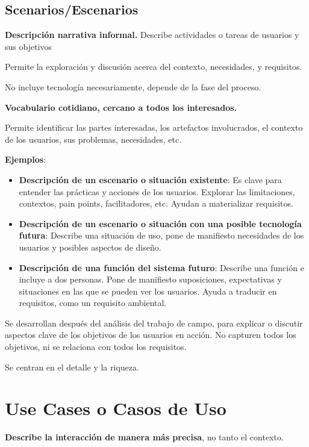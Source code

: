 \documentclass[12pt]{report} %
\begin{document}
\subsection{Scenarios/Escenarios}

\textbf{Descripción narrativa informal.} Describe actividades o tareas
de usuarios y sus objetivos

Permite la exploración y discusión acerca del contexto, necesidades, y
requisitos.

No incluye tecnología necesariamente, depende de la fase del proceso.

\textbf{Vocabulario cotidiano, cercano a todos los interesados.}

Permite identificar las partes interesadas, los artefactos involucrados,
el contexto de los usuarios, sus problemas, necesidades, etc.

\textbf{Ejemplos}:

\begin{itemize}

\item
  \textbf{Descripción de un escenario o situación existente}: Es clave
  para entender las prácticas y acciones de los usuarios. Explorar las
  limitaciones, contextos, pain points, facilitadores, etc. Ayudan a
  materializar requisitos.
\item
  \textbf{Descripción de un escenario o situación con una posible
  tecnología futura}: Describe una situación de uso, pone de manifiesto
  necesidades de los usuarios y posibles aspectos de diseño.
\item
  \textbf{Descripción de una función del sistema futuro}: Describe una
  función e incluye a dos personas. Pone de manifiesto suposiciones,
  expectativas y situaciones en las que se pueden ver los usuarios.
  Ayuda a traducir en requisitos, como un requisito ambiental.
\end{itemize}

Se desarrollan después del análisis del trabajo de campo, para explicar
o discutir aspectos clave de los objetivos de los usuarios en acción. No
capturen todos los objetivos, ni se relaciona con todos los requisitos.

Se centran en el detalle y la riqueza.

\section{Use Cases o Casos de Uso}

\textbf{Describe la interacción de manera más precisa}, no tanto el
contexto.
\end{document}
